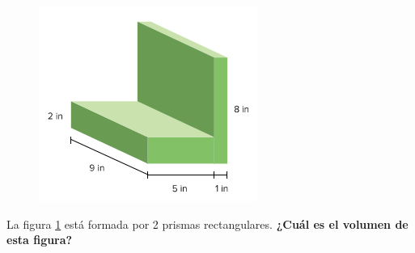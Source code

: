 \begin{multicols}{2}
    \begin{figure}[H]
        \centering
        \caption{}
        \label{fig:20230316201422}
        \includegraphics[width=0.6\linewidth]{../images/20230316201422}
    \end{figure}
    \columnbreak
    La figura \ref{fig:20230316201422} está formada por 2 prismas rectangulares.
    \textbf{¿Cuál es el volumen de esta figura?}
\end{multicols}
